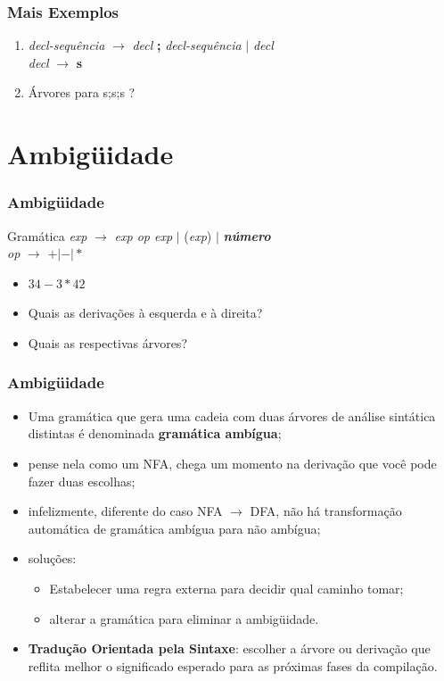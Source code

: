 \documentclass[table]{beamer}
\begin{document}
\begin{frame}
   \frametitle{Mais Exemplos}
   \begin{enumerate}
      \item[] \textit{decl-sequência} $\to$ \textit{decl} \textbf{;} \textit{decl-sequência} $|$ \textit{decl} \\
      \textit{decl} $\to$ \textbf{s}
      \item[] Árvores para s;s;s ?
   \end{enumerate}
\end{frame}

\section{Ambigüidade}
\begin{frame}
   \frametitle{Ambigüidade}
   \begin{block}{Gramática}
   \textit{exp} $\to$ \textit{exp op exp} $|$ (\textit{exp}) $|$ \textbf{\textit{número}} \\
   \textit{op} $\to$ $+|-|*$ \\
   \begin{itemize}
      \item $34 - 3 * 42$
      \item Quais as derivações à esquerda e à direita?
      \item Quais as respectivas árvores?
   \end{itemize}
   \end{block}
\end{frame}

\begin{frame}
   \frametitle{Ambigüidade}
   \begin{itemize}
      \item Uma gramática que gera uma cadeia com duas árvores de análise sintática distintas é denominada \textbf{gramática ambígua};
      \item pense nela como um NFA, chega um momento na derivação que você pode fazer duas escolhas;
      \item infelizmente, diferente do caso NFA $\to$ DFA, não há transformação automática de gramática ambígua para não ambígua;
      \item soluções:
      \begin{itemize}
         \item Estabelecer uma regra externa para decidir qual caminho tomar;
	 \item alterar a gramática para eliminar a ambigüidade.
      \end{itemize}
      \item \textbf{Tradução Orientada pela Sintaxe}: escolher a árvore ou derivação que reflita melhor o significado esperado para as próximas fases da compilação.
   \end{itemize}
\end{frame}
\end{document}
